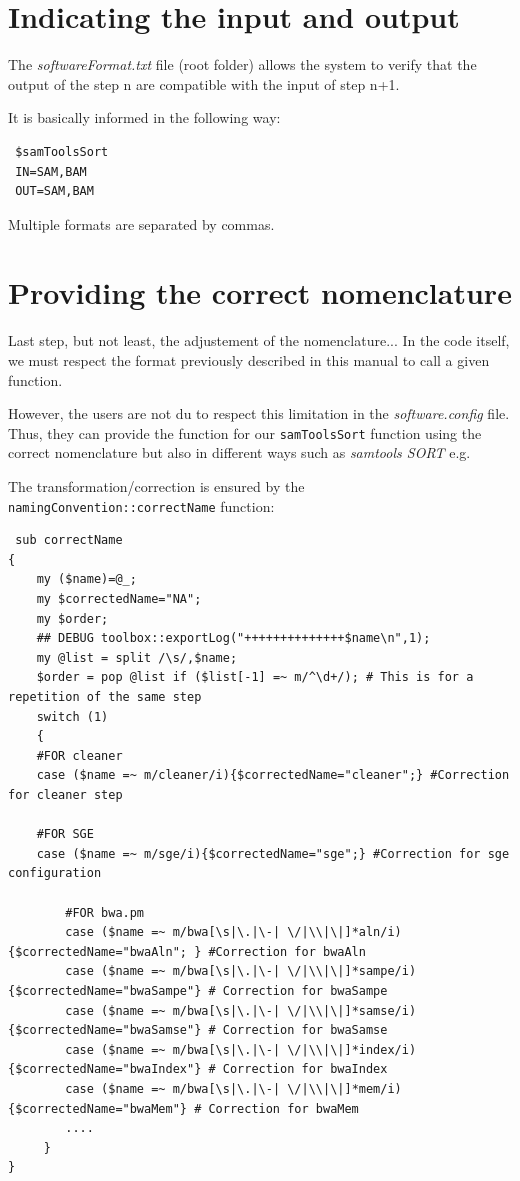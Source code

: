 \documentclass[a4paper,10pt]{report}
\begin{document}
\section{Indicating the input and output}

The \emph{softwareFormat.txt} file (root folder) allows the system to verify that the output of the step n are compatible with the input of step n+1.

It is basically informed in the following way:

\begin{verbatim}
 $samToolsSort
 IN=SAM,BAM
 OUT=SAM,BAM
\end{verbatim}

Multiple formats are separated by commas.

\section{Providing the correct nomenclature}

Last step, but not least, the adjustement of the nomenclature... In the code itself, we must respect the format previously described in this manual to call a given function.

However, the users are not du to respect this limitation in the \emph{software.config} file. Thus, they can provide the function for our \texttt{samToolsSort} function using the correct nomenclature but also in different ways such as \textit{samtools SORT} e.g.

The transformation/correction is ensured by the \texttt{namingConvention::correctName} function:

\begin{lstlisting}
 sub correctName
{
    my ($name)=@_;
    my $correctedName="NA";
    my $order;
    ## DEBUG toolbox::exportLog("++++++++++++++$name\n",1);
    my @list = split /\s/,$name;
    $order = pop @list if ($list[-1] =~ m/^\d+/); # This is for a repetition of the same step
    switch (1)
    {
	#FOR cleaner
	case ($name =~ m/cleaner/i){$correctedName="cleaner";} #Correction for cleaner step
	
	#FOR SGE
	case ($name =~ m/sge/i){$correctedName="sge";} #Correction for sge configuration
	
        #FOR bwa.pm
        case ($name =~ m/bwa[\s|\.|\-| \/|\\|\|]*aln/i){$correctedName="bwaAln"; } #Correction for bwaAln
        case ($name =~ m/bwa[\s|\.|\-| \/|\\|\|]*sampe/i){$correctedName="bwaSampe"} # Correction for bwaSampe
        case ($name =~ m/bwa[\s|\.|\-| \/|\\|\|]*samse/i){$correctedName="bwaSamse"} # Correction for bwaSamse
        case ($name =~ m/bwa[\s|\.|\-| \/|\\|\|]*index/i){$correctedName="bwaIndex"} # Correction for bwaIndex
        case ($name =~ m/bwa[\s|\.|\-| \/|\\|\|]*mem/i){$correctedName="bwaMem"} # Correction for bwaMem
        ....
     }
}
\end{lstlisting}
\end{document}
